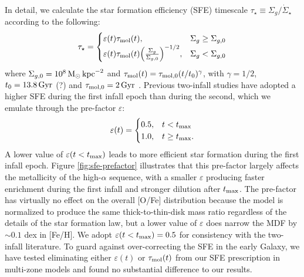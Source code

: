 \documentclass[twocolumn,twocolappendix,linenumbers]{aastex631}
\newcommand{\todo}[1]{{\color{red}#1}}
\newcommand{\kpc}{\,{\rm kpc}}
\begin{document}
In detail, we calculate the star formation efficiency (SFE) timescale $\tau_\star\equiv\Sigma_g/\dot\Sigma_\star$ according to the following:
\begin{equation}
    \label{eq:sf-law}
    \tau_\star = 
    \begin{cases}
        \varepsilon(t) \tau_{\rm mol}(t),   & \Sigma_g \ge \Sigma_{g,0} \\
        \varepsilon(t) \tau_{\rm mol}(t) \Big(\frac{\Sigma_g}{\Sigma_{g,0}}\Big)^{-1/2}, & \Sigma_g < \Sigma_{g,0}
    \end{cases}
\end{equation}
where $\Sigma_{g,0} = 10^8\,{\rm M}_\odot\kpc^{-2}$ and $\tau_{\rm mol}(t)=\tau_{\rm mol,0}(t/t_0)^\gamma$, with $\gamma=1/2$, $t_0=13.8\,{\rm Gyr}$ \todo{(?)} and $\tau_{\rm mol,0}=2\,{\rm Gyr}$ \citet{leroy_star_2008}. Previous two-infall studies \citep[e.g.,][]{nissen_high-precision_2020} have adopted a higher SFE during the first infall epoch than during the second, which we emulate through the pre-factor $\varepsilon$:
\begin{equation}
    \label{eq:sfe-prefactor}
    \varepsilon(t) = 
    \begin{cases}
        0.5, & t < t_{\rm max} \\
        1.0, & t \ge t_{\rm max}.
    \end{cases}
\end{equation}
A lower value of $\varepsilon(t<t_{\rm max})$ leads to more efficient star formation during the first infall epoch. Figure \ref{fig:sfe-prefactor} illustrates that this pre-factor largely affects the metallicity of the high-$\alpha$ sequence, with a smaller $\varepsilon$ producing faster enrichment during the first infall and stronger dilution after $t_{\rm max}$. The pre-factor has virtually no effect on the overall [O/Fe] distribution because the model is normalized to produce the same thick-to-thin-disk mass ratio regardless of the details of the star formation law, but a lower value of $\varepsilon$ does narrow the MDF by $\sim0.1$ dex in [Fe/H]. We adopt $\varepsilon(t<t_{\rm max})=0.5$ for consistency with the two-infall literature. To guard against over-correcting the SFE in the early Galaxy, we have tested eliminating either $\varepsilon(t)$ or $\tau_{\rm mol}(t)$ from our SFE prescription in multi-zone models and found no substantial difference to our results.
\end{document}
